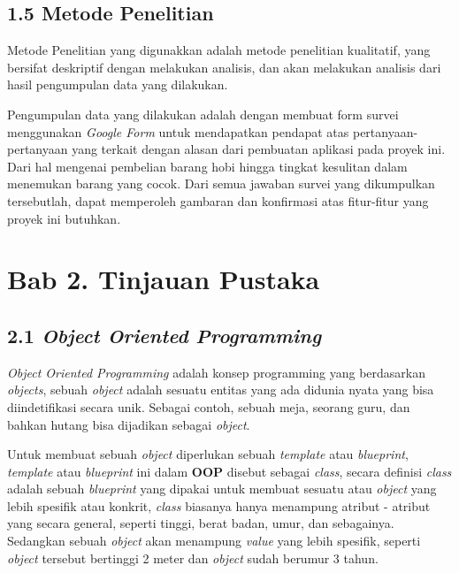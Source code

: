 \documentclass[a4paper]{article}
\begin{document}
\subsection*{1.5 Metode Penelitian}

Metode Penelitian yang digunakkan adalah metode penelitian kualitatif, yang bersifat deskriptif dengan melakukan analisis\autocite{pengajar-kualitatif}, dan akan melakukan analisis dari hasil pengumpulan data yang dilakukan.


Pengumpulan data yang dilakukan adalah dengan membuat form survei menggunakan \textit{Google Form} untuk mendapatkan pendapat atas pertanyaan-pertanyaan yang terkait dengan alasan dari pembuatan aplikasi pada proyek ini. Dari hal mengenai pembelian barang hobi hingga tingkat kesulitan dalam menemukan barang yang cocok. Dari semua jawaban survei yang dikumpulkan tersebutlah, dapat memperoleh gambaran dan konfirmasi atas fitur-fitur yang proyek ini butuhkan.

\newpage
\section*{Bab 2. Tinjauan Pustaka}


\subsection*{2.1 \textit{Object Oriented Programming}}
\textit{Object Oriented Programming} adalah konsep programming yang berdasarkan \textit{objects}, sebuah \textit{object} adalah sesuatu entitas yang ada didunia nyata yang bisa diindetifikasi secara unik\autocite{liang_liang_2021}. Sebagai contoh, sebuah meja, seorang guru, dan bahkan hutang bisa dijadikan sebagai \textit{object}.

Untuk membuat sebuah \textit{object} diperlukan sebuah \textit{template} atau \textit{blueprint}, \textit{template} atau \textit{blueprint} ini dalam \textbf{OOP} disebut sebagai \textit{class}, secara definisi \textit{class} adalah sebuah \textit{blueprint} yang dipakai untuk membuat sesuatu atau \textit{object} yang lebih spesifik atau konkrit\autocite{education-erin-oop-2020}, \textit{class} biasanya hanya menampung atribut - atribut yang secara general, seperti tinggi, berat badan, umur, dan sebagainya. Sedangkan sebuah \textit{object} akan menampung \textit{value} yang lebih spesifik, seperti \textit{object} tersebut bertinggi 2 meter dan \textit{object} sudah berumur 3 tahun.
\end{document}
